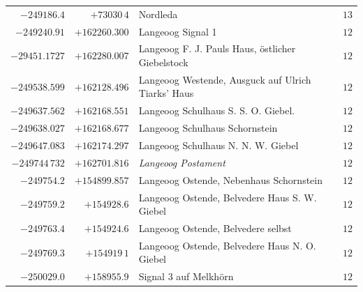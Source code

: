 \begin{center}
\begin{tabular}{r|r|p{170pt}|r}
\(-249186.4\)&\(+73030\,4\)&Nordleda&\(13\)\\
\(-249240.91\)&\(+162260.300\)&Langeoog Signal 1&\(12\)\\
\(-29451.1727\)&\(+162280.007\)&Langeoog F. J. Pauls Haus, östlicher Giebelstock&\(12\)\\
\(-249538.599\)&\(+162128.496\)&Langeoog Westende, Ausguck auf Ulrich Tiarks’ Haus&\(12\)\\
\(-249637.562\)&\(+162168.551\)&Langeoog Schulhaus S. S. O. Giebel.&\(12\)\\
\(-249638.027\)&\(+162168.677\)&Langeoog Schulhaus Schornstein&\(12\)\\
\(-249647.083\)&\(+162174.297\)&Langeoog Schulhaus N. N. W. Giebel&\(12\)\\
\(-249744\,732\)&\(+162701.816\)&\textit{Langeoog Postament}&\(12\)\\
\(-249754.2\)&\(+154899.857\)&Langeoog Ostende, Nebenhaus Schornstein&\(12\)\\
\(-249759.2\)&\(+154928.6\)&Langeoog Ostende, Belvedere Haus S. W. Giebel&\(12\)\\
\(-249763.4\)&\(+154924.6\)&Langeoog Ostende, Belvedere selbst&\(12\)\\
\(-249769.3\)&\(+154919\,1\)&Langeoog Ostende, Belvedere Haus N. O. Giebel&\(12\)\\
\(-250029.0\)&\(+158955.9\)&Signal 3 auf Melkhörn&\(12\)\\
\hline\end{tabular}\endgroup\end{center}
\clearpage

